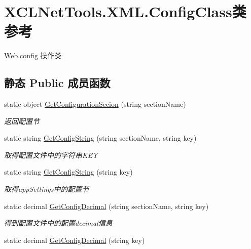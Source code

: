 \hypertarget{class_x_c_l_net_tools_1_1_x_m_l_1_1_config_class}{}\section{X\+C\+L\+Net\+Tools.\+X\+M\+L.\+Config\+Class类 参考}
\label{class_x_c_l_net_tools_1_1_x_m_l_1_1_config_class}


Web.\+config 操作类  


\subsection*{静态 Public 成员函数}
\begin{DoxyCompactItemize}
\item 
static object \hyperlink{class_x_c_l_net_tools_1_1_x_m_l_1_1_config_class_aaad0da3f0f225afe8f90fef3601e952a}{Get\+Configuration\+Secion} (string section\+Name)
\begin{DoxyCompactList}\small\item\em 返回配置节 \end{DoxyCompactList}\item 
static string \hyperlink{class_x_c_l_net_tools_1_1_x_m_l_1_1_config_class_a253cc7b4b74bea0a5a6843ef23b58165}{Get\+Config\+String} (string section\+Name, string key)
\begin{DoxyCompactList}\small\item\em 取得配置文件中的字符串\+K\+EY \end{DoxyCompactList}\item 
static string \hyperlink{class_x_c_l_net_tools_1_1_x_m_l_1_1_config_class_aceec5701515f9c2fdddcdc1c819b4dc3}{Get\+Config\+String} (string key)
\begin{DoxyCompactList}\small\item\em 取得app\+Settings中的配置节 \end{DoxyCompactList}\item 
static decimal \hyperlink{class_x_c_l_net_tools_1_1_x_m_l_1_1_config_class_a508cd35e095d82d3605ec9188e6145cc}{Get\+Config\+Decimal} (string section\+Name, string key)
\begin{DoxyCompactList}\small\item\em 得到配置文件中的配置decimal信息 \end{DoxyCompactList}\item 
static decimal \hyperlink{class_x_c_l_net_tools_1_1_x_m_l_1_1_config_class_ae80b8dff596de60fc8f7c1f6376ddb4b}{Get\+Config\+Decimal} (string key)

\end{DoxyCompactItemize}
